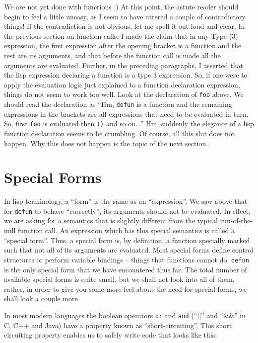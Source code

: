 \documentclass[10pt]{article}
\begin{document}
We are not yet done with functions :) At this point, the astute reader should
begin to feel a little uneasy, as I seem to have uttered a couple of
contradictory things!  If the contradiction is not obvious, let me spell it out
loud and clear.  In the previous section on function calls, I made the claim
that in any Type (3) expression, the first expression after the opening bracket
is a function and the rest are its arguments, and that before the function call
is made all the arguments are evaluated.  Further, in the preceding paragraphs,
I asserted that the lisp expression declaring a function is a type 3
expression.  So, if one were to apply the evaluation logic just explained to a
function declaration expression, things do not seem to work too well.  Look at
the declaration of \texttt{foo} above.  We should read the declaration as ``Hm,
\texttt{defun} is a function and the remaining expressions in the brackets are
all expressions that need to be evaluated in turn.  So, first \texttt{foo} is
evaluated then \texttt{()} and so on...''  Hm, suddenly the elegance of a lisp
function declaration seems to be crumbling.  Of course, all this shit does not
happen.  Why this does not happen is the topic of the next section.

\section{Special Forms}

In lisp terminology, a ``form'' is the same as an ``expression''.  We saw above
that for \texttt{defun} to behave ``correctly'', its arguments should not be
evaluated.  In effect, we are asking for a semantics that is slightly different
from the typical run-of-the-mill function call.  An expression which has this
special semantics is called a ``special form''.  Thus, a special form is, by
definition, a function specially marked such that not all of its arguments are
evaluated.  Most special forms define control structures or perform variable
bindings -- things that functions cannot do.  \texttt{defun} is the only
special form that we have encountered thus far.  The total number of available
special forms is quite small, but we shall not look into all of them, rather,
in order to give you some more feel about the need for special forms, we shall
look a couple more.

In most modern languages the boolean operators \texttt{or} and \texttt{and}
(``$||$'' and ``\&\&'' in C, C++ and Java) have a property known as
``short-circuiting''.  This short circuiting property enables us to safely
write code that looks like this:
\end{document}
